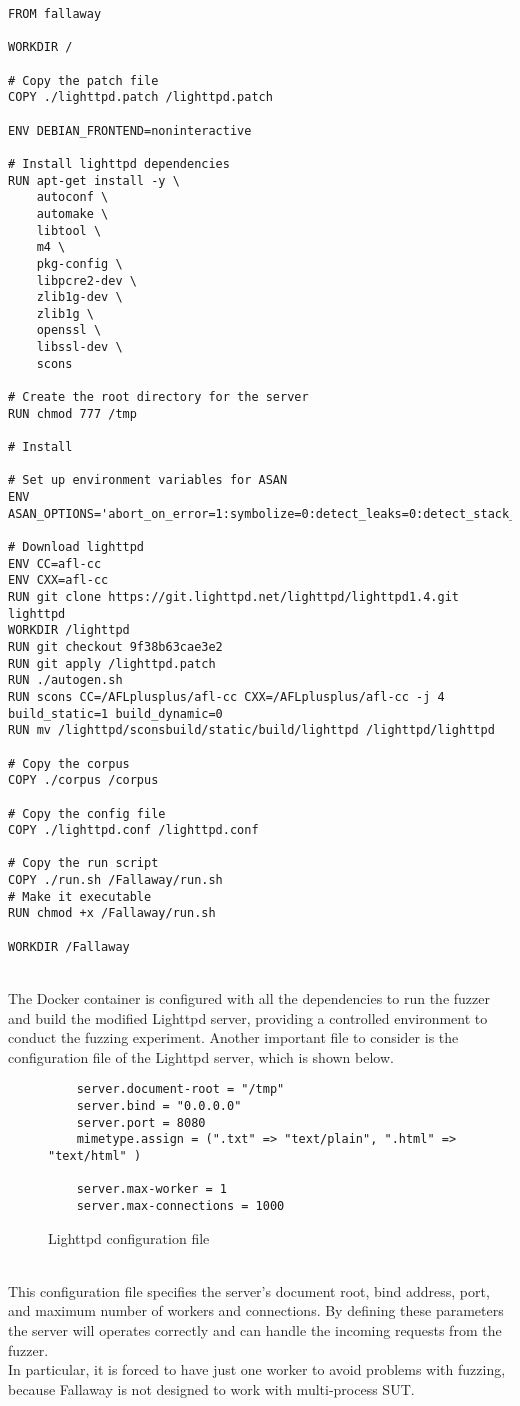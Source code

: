 \begin{lstlisting}
FROM fallaway 

WORKDIR /

# Copy the patch file
COPY ./lighttpd.patch /lighttpd.patch

ENV DEBIAN_FRONTEND=noninteractive

# Install lighttpd dependencies
RUN apt-get install -y \
    autoconf \
    automake \
    libtool \
    m4 \
    pkg-config \
    libpcre2-dev \
    zlib1g-dev \
    zlib1g \
    openssl \
    libssl-dev \
    scons

# Create the root directory for the server
RUN chmod 777 /tmp

# Install

# Set up environment variables for ASAN
ENV ASAN_OPTIONS='abort_on_error=1:symbolize=0:detect_leaks=0:detect_stack_use_after_return=1:detect_container_overflow=0:poison_array_cookie=0:malloc_fill_byte=0:max_malloc_fill_size=16777216'

# Download lighttpd
ENV CC=afl-cc
ENV CXX=afl-cc
RUN git clone https://git.lighttpd.net/lighttpd/lighttpd1.4.git lighttpd
WORKDIR /lighttpd 
RUN git checkout 9f38b63cae3e2
RUN git apply /lighttpd.patch
RUN ./autogen.sh  
RUN scons CC=/AFLplusplus/afl-cc CXX=/AFLplusplus/afl-cc -j 4 build_static=1 build_dynamic=0
RUN mv /lighttpd/sconsbuild/static/build/lighttpd /lighttpd/lighttpd

# Copy the corpus
COPY ./corpus /corpus

# Copy the config file
COPY ./lighttpd.conf /lighttpd.conf

# Copy the run script
COPY ./run.sh /Fallaway/run.sh
# Make it executable
RUN chmod +x /Fallaway/run.sh

WORKDIR /Fallaway
\end{lstlisting}
\phantom{}\\
The Docker container is configured with all the dependencies to run the fuzzer and build the modified Lighttpd server, providing a controlled environment to conduct the fuzzing experiment.
Another important file to consider is the configuration file of the Lighttpd server, which is shown below.\\
\begin{figure}[H]
\begin{lstlisting}
    server.document-root = "/tmp"
    server.bind = "0.0.0.0"
    server.port = 8080
    mimetype.assign = (".txt" => "text/plain", ".html" => "text/html" )

    server.max-worker = 1 
    server.max-connections = 1000
\end{lstlisting}
\caption{Lighttpd configuration file}
\label{fig:lighttpd_conf_fallaway}
\end{figure}
\phantom{}\\
This configuration file specifies the server's document root, bind address, port, and maximum number of workers and connections. By defining these parameters the server will operates correctly and can handle the incoming requests from the fuzzer.
\\In particular, it is forced to have just one worker to avoid problems with fuzzing, because Fallaway is not designed to work with multi-process SUT.

